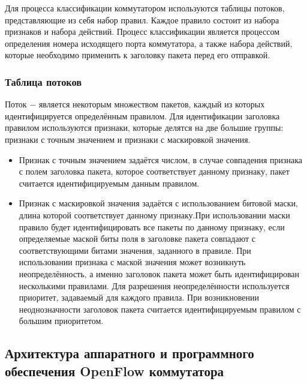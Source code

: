 \documentclass[oneside,final,12pt]{extarticle}
\begin{document}
            Для процесса классификации коммутатором используются таблицы потоков, представляющие из себя набор правил. Каждое правило состоит из набора признаков
            и набора действий. Процесс классификации является процессом определения номера исходящего порта коммутатора, а также набора действий, которые необходимо 
            применить к заголовку пакета перед его отправкой.
            \subsubsection{Таблица потоков}
                Поток $-$ является некоторым множеством пакетов, каждый из которых идентифицируется определённым правилом. Для идентификации заголовка правилом
                используются признаки, которые делятся на две большие группы: признаки с точным значением и признаки с маскировкой значения.
                \begin{itemize}
                    \item Признак с точным значением задаётся числом, в случае совпадения признака с полем заголовка пакета, которое соответствует данному признаку,
                        пакет считается идентифицируемым данным правилом.
                    \item Признак с маскировкой значения задаётся с использованием битовой маски, длина которой соответствует данному признаку.При использовании
                        маски правило будет идентифицировать все пакеты по данному признаку, если определяемые маской биты поля в заголовке пакета совпадают с соответствующими битами
                        значения, заданного в правиле. При использовании признака с маской значения может возникнуть неопределённость, а именно заголовок пакета может
                        быть идентифицирован несколькими правилами. Для разрешения неопределённости используется приоритет, задаваемый для каждого правила. При возникновении
                        неоднозначности заголовок пакета считается идентифицируемым правилом с большим приоритетом.
                \end{itemize}
        \subsection{Архитектура аппаратного и программного обеспечения OpenFlow коммутатора}
\end{document}
